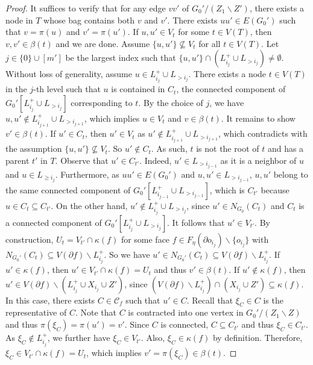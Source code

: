 \documentclass[a4paper,11pt]{article}
\numberwithin{lemma}{section}
\begin{document}
\begin{proof}
It suffices to verify that for any edge $vv'$ of $G_0'/(Z_1 \backslash Z')$, there exists a node in $T$ whose bag contains both $v$ and $v'$.
There exists $uu' \in E(G_0')$ such that $v = \pi(u)$ and $v' = \pi(u')$.
If $u,u' \in V_t$ for some $t \in V(T)$, then $v,v' \in \beta(t)$ and we are done.
Assume $\{u,u'\} \nsubseteq V_t$ for all $t \in V(T)$.
Let $j \in \{0\} \cup [m']$ be the largest index such that $\{u,u'\} \cap (L_{i_j}^+ \cup L_{>i_j}) \neq \emptyset$.
Without loss of generality, assume $u \in L_{i_j}^+ \cup L_{>i_j}$.
There exists a node $t \in V(T)$ in the $j$-th level such that $u$ is contained in $C_t$, the connected component of $G_0'[L_{i_j}^+ \cup L_{> i_j}]$ corresponding to $t$.
By the choice of $j$, we have $u,u' \notin L_{i_{j+1}}^+ \cup L_{>i_{j+1}}$, which implies $u \in V_t$ and $v \in \beta(t)$.
It remains to show $v' \in \beta(t)$.
If $u' \in C_t$, then $u' \in V_t$ as $u' \notin L_{i_{j+1}}^+ \cup L_{>i_{j+1}}$, which contradicts with the assumption $\{u,u'\} \nsubseteq V_t$.
So $u' \notin C_t$.
As such, $t$ is not the root of $t$ and has a parent $t'$ in $T$.
Observe that $u' \in C_{t'}$.
Indeed, $u' \in L_{>i_{j-1}}$ as it is a neighbor of $u$ and $u \in L_{\geq i_j}$.
Furthermore, as $uu' \in E(G_0')$ and $u,u' \in L_{>i_{j-1}}$, $u,u'$ belong to the same connected component of $G_0'[L_{i_{j-1}}^+ \cup L_{>i_{j-1}}]$, which is $C_{t'}$ because $u \in C_t \subseteq C_{t'}$.
On the other hand, $u' \notin L_{i_j}^+ \cup L_{>i_j}$, since $u' \in N_{G_0}(C_t)$ and $C_t$ is a connected component of $G_0'[L_{i_j}^+ \cup L_{> i_j}]$.
It follows that $u' \in V_{t'}$.
By construction, $U_t = V_{t'} \cap \kappa(f)$ for some face $f \in F_\eta(\partial o_{i_j}) \backslash \{o_{i_j}\}$ with $N_{G_0'}(C_t) \subseteq V(\partial f) \backslash L_{i_j}^+$.
So we have $u' \in N_{G_0'}(C_t) \subseteq V(\partial f) \backslash L_{i_j}^+$.
If $u' \in \kappa(f)$, then $u' \in V_{t'} \cap \kappa(f) = U_t$ and thus $v' \in \beta(t)$.
If $u' \notin \kappa(f)$, then $u' \in V(\partial f) \backslash (L_{i_j}^+ \cup X_{i_j} \cup Z')$, since $(V(\partial f) \backslash L_{i_j}^+) \cap (X_{i_j} \cup Z') \subseteq \kappa(f)$.
In this case, there exists $C \in \mathcal{C}_f$ such that $u' \in C$.
Recall that $\xi_C \in C$ is the representative of $C$.
Note that $C$ is contracted into one vertex in $G_0'/(Z_1 \backslash Z)$ and thus $\pi(\xi_C) = \pi(u') = v'$.
Since $C$ is connected, $C \subseteq C_{t'}$ and thus $\xi_C \in C_{t'}$.
As $\xi_C \notin L_{i_j}^+$, we further have $\xi_C \in V_{t'}$.
Also, $\xi_C \in \kappa(f)$ by definition.
Therefore, $\xi_C \in V_{t'} \cap \kappa(f) = U_t$, which implies $v' = \pi(\xi_C) \in \beta(t)$.


\end{proof}
\end{document}
